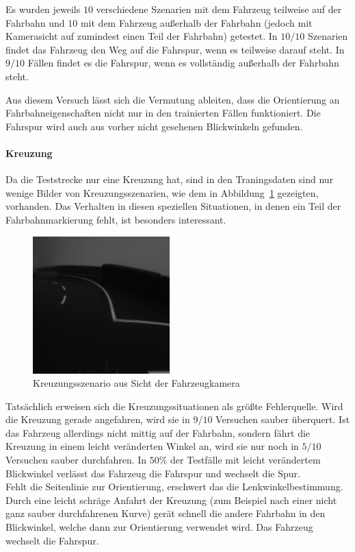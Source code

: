 Es wurden jeweils $10$ verschiedene Szenarien mit dem Fahrzeug teilweise auf der Fahrbahn und $10$ mit dem Fahrzeug außerhalb der Fahrbahn (jedoch mit Kamerasicht auf zumindest einen Teil der Fahrbahn) getestet. In $10/10$ Szenarien findet das Fahrzeug den Weg auf die Fahrspur, wenn es teilweise darauf steht. In $9/10$ Fällen findet es die Fahrspur, wenn es vollständig außerhalb der Fahrbahn steht.

Aus diesem Versuch lässt sich die Vermutung ableiten, dass die Orientierung an Fahrbahneigenschaften nicht nur in den trainierten Fällen funktioniert. Die Fahrspur wird auch aus vorher nicht gesehenen Blickwinkeln gefunden.

\paragraph{Kreuzung}
Da die Teststrecke nur eine Kreuzung hat, sind in den Traningsdaten sind nur wenige Bilder von Kreuzungsszenarien, wie dem in Abbildung~\ref{img:szenariokreuzung} gezeigten, vorhanden. Das Verhalten in diesen speziellen Situationen, in denen ein Teil der Fahrbahnmarkierung fehlt, ist besonders interessant.

\begin{figure}[h]
	\centering
	\includegraphics[scale=0.7]{figures/szenarioKreuzung.png}
	\caption{Kreuzungsszenario aus Sicht der Fahrzeugkamera}
	\label{img:szenariokreuzung}
\end{figure}

Tatsächlich erweisen sich die Kreuzungssituationen als größte Fehlerquelle. Wird die Kreuzung gerade angefahren, wird sie in $9/10$ Versuchen sauber überquert. Ist das Fahrzeug allerdings nicht mittig auf der Fahrbahn, sondern fährt die Kreuzung in einem leicht veränderten Winkel an, wird sie nur noch in $5/10$ Versuchen sauber durchfahren. In $50 \%$ der Testfälle mit leicht verändertem Blickwinkel verlässt das Fahrzeug die Fahrspur und wechselt die Spur.\\
Fehlt die Seitenlinie zur Orientierung, erschwert das die Lenkwinkelbestimmung. Durch eine leicht schräge Anfahrt der Kreuzung (zum Beispiel nach einer nicht ganz sauber durchfahrenen Kurve) gerät schnell die andere Fahrbahn in den Blickwinkel, welche dann zur Orientierung verwendet wird. Das Fahrzeug wechselt die Fahrspur.


